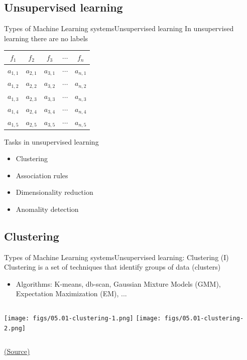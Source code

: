 \documentclass[10pt,compress]{beamer} %
\begin{document}
\subsection{Unsupervised learning}
\begin{frame}{Types of Machine Learning systems}{Unsupervised learning}
	In unsupervised learning there are no labels

	\begin{center}
	\begin{tabular}{ccccc}\hline
		 $f_1$     & $f_2$     & $f_3$     & $\cdots$ & $f_n$     \\\hline
		 $a_{1,1}$ & $a_{2,1}$ & $a_{3,1}$ & $\cdots$ & $a_{n,1}$ \\
		 $a_{1,2}$ & $a_{2,2}$ & $a_{3,2}$ & $\cdots$ & $a_{n,2}$ \\
		 $a_{1,3}$ & $a_{2,3}$ & $a_{3,3}$ & $\cdots$ & $a_{n,3}$ \\
		 $a_{1,4}$ & $a_{2,4}$ & $a_{3,4}$ & $\cdots$ & $a_{n,4}$ \\
		 $a_{1,5}$ & $a_{2,5}$ & $a_{3,5}$ & $\cdots$ & $a_{n,5}$ \\
		 \hline
	 \end{tabular}
	 \end{center}

	Tasks in unsupervised learning
	\begin{itemize}
		\item Clustering
		\item Association rules
		\item Dimensionality reduction
		\item Anomality detection
	\end{itemize}

\end{frame}

\subsection{Clustering}
\begin{frame}{Types of Machine Learning systems}{Unsupervised learning: Clustering (I)}
	Clustering is a set of techniques that identify groups of data (\alert{clusters})
		\begin{itemize}
			\item Algorithms: K-means, db-scan, Gaussian Mixture Models (GMM), Expectation Maximization (EM), ...
		\end{itemize}

    \begin{columns}
			\texttt{[image: figs/05.01-clustering-1.png]}
			\texttt{[image: figs/05.01-clustering-2.png]}
    \end{columns}

    \centering \tiny{\href{https://jakevdp.github.io/PythonDataScienceHandbook/05.01-what-is-machine-learning.html}{(Source)}}
\end{frame}
\end{document}
